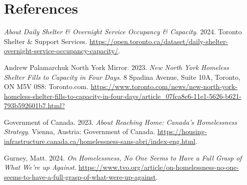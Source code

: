 \documentclass[
  letterpaper,
  DIV=11,
  numbers=noendperiod]{scrartcl}
\newlength{\cslhangindent}
\newenvironment{CSLReferences}[2] %
 {\begin{list}{}{%
  \setlength{\itemindent}{0pt}
  \setlength{\leftmargin}{0pt}
  \setlength{\parsep}{0pt}
  \ifodd #1
   \setlength{\leftmargin}{\cslhangindent}
   \setlength{\itemindent}{-1\cslhangindent}
  \fi
  \setlength{\itemsep}{#2\baselineskip}}}
 {\end{list}}
\begin{document}
\newpage

\section*{References}\label{references}

\label{refs}
\begin{CSLReferences}{1}{0}
\emph{About Daily Shelter \& Overnight Service Occupancy \& Capacity}.
2024. Toronto Shelter \& Support Services.
\url{https://open.toronto.ca/dataset/daily-shelter-overnight-service-occupancy-capacity/}.

Andrew Palamarchuk North York Mirror. 2023. \emph{New North York
Homeless Shelter Fills to Capacity in Four Days}. 8 Spadina Avenue,
Suite 10A, Toronto, ON M5V 0S8: Toronto.com.
\url{https://www.toronto.com/news/new-north-york-homeless-shelter-fills-to-capacity-in-four-days/article_07fca8c6-11e1-5626-b621-793b592601b7.html?}

Government of Canada. 2023. \emph{About Reaching Home: Canada's
Homelessness Strategy}. Vienna, Austria: Government of Canada.
\url{https://housing-infrastructure.canada.ca/homelessness-sans-abri/index-eng.html}.

Gurney, Matt. 2024. \emph{On Homelessness, No One Seems to Have a Full
Grasp of What We're up Against}.
\url{https://www.tvo.org/article/on-homelessness-no-one-seems-to-have-a-full-grasp-of-what-were-up-against}.

\end{CSLReferences}
\end{document}
